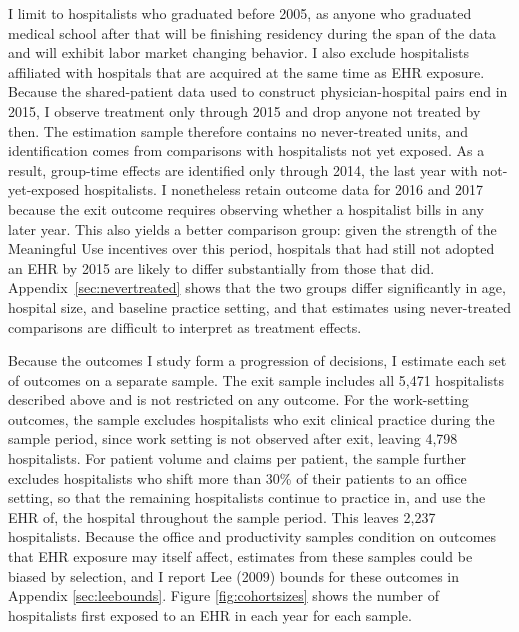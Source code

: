 \documentclass[12pt]{article}
\begin{document}
I limit to hospitalists who graduated before 2005, as anyone who graduated medical school after that will be finishing residency during the span of the data and will exhibit labor market changing behavior. I also exclude hospitalists affiliated with hospitals that are acquired at the same time as EHR exposure. Because the shared-patient data used to construct physician-hospital pairs end in 2015, I observe treatment only through 2015 and drop anyone not treated by then. The estimation sample therefore contains no never-treated units, and identification comes from comparisons with hospitalists not yet exposed. As a result, group-time effects are identified only through 2014, the last year with not-yet-exposed hospitalists. I nonetheless retain outcome data for 2016 and 2017 because the exit outcome requires observing whether a hospitalist bills in any later year. This also yields a better comparison group: given the strength of the Meaningful Use incentives over this period, hospitals that had still not adopted an EHR by 2015 are likely to differ substantially from those that did. Appendix~\ref{sec:nevertreated} shows that the two groups differ significantly in age, hospital size, and baseline practice setting, and that estimates using never-treated comparisons are difficult to interpret as treatment effects.

Because the outcomes I study form a progression of decisions, I estimate each set of outcomes on a separate sample. The exit sample includes all 5,471 hospitalists described above and is not restricted on any outcome. For the work-setting outcomes, the sample excludes hospitalists who exit clinical practice during the sample period, since work setting is not observed after exit, leaving 4,798 hospitalists. For patient volume and claims per patient, the sample further excludes hospitalists who shift more than 30\% of their patients to an office setting, so that the remaining hospitalists continue to practice in, and use the EHR of, the hospital throughout the sample period. This leaves 2,237 hospitalists. Because the office and productivity samples condition on outcomes that EHR exposure may itself affect, estimates from these samples could be biased by selection, and I report Lee (2009) bounds for these outcomes in Appendix \ref{sec:leebounds}. Figure \ref{fig:cohortsizes} shows the number of hospitalists first exposed to an EHR in each year for each sample.
\end{document}
